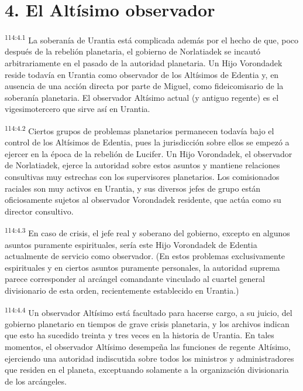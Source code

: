 \documentclass[twoside, 11pt]{book}
\begin{document}
\section*{4. El Altísimo observador}
\par
\textsuperscript{114:4.1} La soberanía de Urantia está complicada además por el hecho de que, poco después de la rebelión planetaria, el gobierno de Norlatiadek se incautó arbitrariamente en el pasado de la autoridad planetaria. Un Hijo Vorondadek reside todavía en Urantia como observador de los Altísimos de Edentia y, en ausencia de una acción directa por parte de Miguel, como fideicomisario de la soberanía planetaria. El observador Altísimo actual (y antiguo regente) es el vigesimotercero que sirve así en Urantia.

\par
\textsuperscript{114:4.2} Ciertos grupos de problemas planetarios permanecen todavía bajo el control de los Altísimos de Edentia, pues la jurisdicción sobre ellos se empezó a ejercer en la época de la rebelión de Lucifer. Un Hijo Vorondadek, el observador de Norlatiadek, ejerce la autoridad sobre estos asuntos y mantiene relaciones consultivas muy estrechas con los supervisores planetarios. Los comisionados raciales son muy activos en Urantia, y sus diversos jefes de grupo están oficiosamente sujetos al observador Vorondadek residente, que actúa como su director consultivo.

\par
\textsuperscript{114:4.3} En caso de crisis, el jefe real y soberano del gobierno, excepto en algunos asuntos puramente espirituales, sería este Hijo Vorondadek de Edentia actualmente de servicio como observador. (En estos problemas exclusivamente espirituales y en ciertos asuntos puramente personales, la autoridad suprema parece corresponder al arcángel comandante vinculado al cuartel general divisionario de esta orden, recientemente establecido en Urantia.)

\par
\textsuperscript{114:4.4} Un observador Altísimo está facultado para hacerse cargo, a su juicio, del gobierno planetario en tiempos de grave crisis planetaria, y los archivos indican que esto ha sucedido treinta y tres veces en la historia de Urantia. En tales momentos, el observador Altísimo desempeña las funciones de regente Altísimo, ejerciendo una autoridad indiscutida sobre todos los ministros y administradores que residen en el planeta, exceptuando solamente a la organización divisionaria de los arcángeles.
\end{document}
